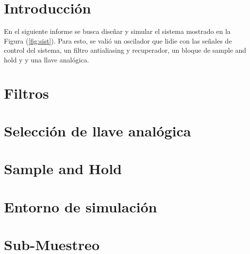 







\tableofcontents
\newpage


\section{Introducción}

En el siguiente informe se busca diseñar y simular el sistema mostrado en la Figura (\ref{fig:sist}). Para esto, se valió un oscilador que lidie con las señales de control del sistema, un filtro antialiasing y recuperador, un bloque de sample and hold y y una llave analógica.

%	


\section{Filtros}
	\label{Ejercicio-2}
	

\section{Selección de llave analógica}
	\label{Ejercicio-3}
	
	
\section{Sample and Hold}
	\label{Ejercicio-4}
	
	

\section{Entorno de simulación}
	\label{Ejercicio-5}
	
	
\section{Sub-Muestreo}
	\label{Ejercicio-8}
	
	
